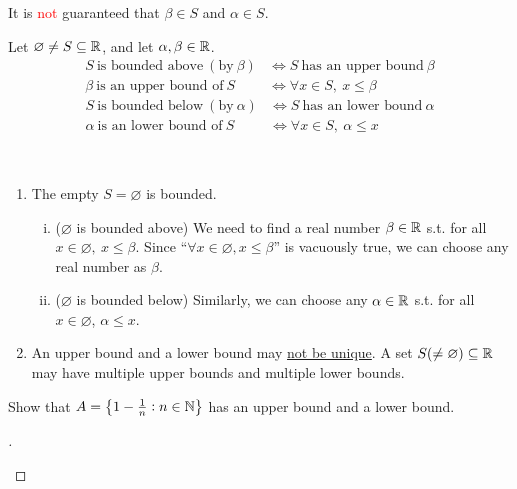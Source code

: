 \documentclass[11pt,openany]{article}
\begin{document}
\begin{remark*}[\textcolor{red}{\bf Caution!}]
	It is \textcolor{red}{not} guaranteed that $\beta\in S$ and $\alpha\in S$.
\end{remark*}
\vfill
\begin{remark*}
	Let $\varnothing\neq S\subseteq\mathbb{R}$, and let $\alpha,\beta\in\mathbb{R}$.
	\begin{align*}
		S\ \text{is bounded above}\ (\text{by}\ \beta) &\iff S\ \text{has an upper bound}\ \beta\\
		\beta\ \text{is an upper bound of}\ S &\iff \forall x\in S,\ x\leq \beta
	\end{align*}
	\begin{align*}
		S\ \text{is bounded below}\ (\text{by}\ \alpha) &\iff S\ \text{has an lower bound}\ \alpha\\
		\alpha\ \text{is an lower bound of}\ S &\iff \forall x\in S,\ \alpha\leq x
	\end{align*}
\end{remark*}
\vfill
\begin{remark*}
\ \begin{enumerate}
	\item The empty $S=\varnothing$ is bounded.
	\begin{enumerate}[(i)]
		\item ($\varnothing$ is bounded above) We need to find a real number $\beta\in\mathbb{R}$ s.t. for all $x\in\varnothing,\ x\leq\beta$. Since ``$\forall x\in\varnothing, x\leq\beta$'' is vacuously true, we can choose any real number as $\beta$.
		\item ($\varnothing$ is bounded below) Similarly, we can choose any $\alpha\in\mathbb{R}$ s.t. for all $x\in\varnothing$, $\alpha\leq x$.
	\end{enumerate}
	\item An upper bound and a lower bound may \underline{not be unique}. A set \( S(\neq\varnothing)\subseteq\mathbb{R} \) may have multiple upper bounds and multiple lower bounds.
\end{enumerate}
\end{remark*}
\newpage
\begin{exercise*}
Show that $A=\set{1-\frac{1}{n}:n\in\mathbb{N}}$ has an upper bound and a lower bound.
\begin{proof}[\sol]
\ 	
	\begin{center}
	
	\end{center}
\vfill
\end{proof}
\end{exercise*}
\end{document}
